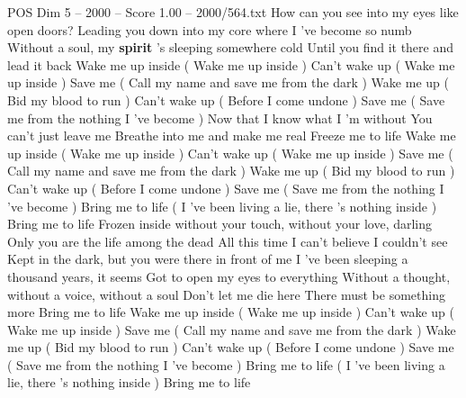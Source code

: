 \begin{textsample}{POS Dim 5 – 2000 – Score 1.00 – 2000/564.txt}  \label{ex:f5_pos_012}
How can you see into my eyes like open doors?
Leading you down into my core where I 've become so numb Without a soul, my \textbf{spirit} 's sleeping somewhere cold Until you find it there and lead it back Wake me up inside ( Wake me up inside ) Can't wake up ( Wake me up inside ) Save me ( Call my name and save me from the dark ) Wake me up ( Bid my blood to run ) Can't wake up ( Before I come undone ) Save me ( Save me from the nothing I 've become ) Now that I know what I 'm without You can't just leave me Breathe into me and make me real Freeze me to life Wake me up inside ( Wake me up inside ) Can't wake up ( Wake me up inside ) Save me ( Call my name and save me from the dark ) Wake me up ( Bid my blood to run ) Can't wake up ( Before I come undone ) Save me ( Save me from the nothing I 've become ) Bring me to life ( I 've been living a lie, there 's nothing inside ) Bring me to life Frozen inside without your touch, without your love, darling Only you are the life among the dead All this time I can't believe I couldn't see Kept in the dark, but you were there in front of me I 've been sleeping a thousand years, it seems Got to open my eyes to everything Without a thought, without a voice, without a soul Don't let me die here There must be something more Bring me to life Wake me up inside ( Wake me up inside ) Can't wake up ( Wake me up inside ) Save me ( Call my name and save me from the dark ) Wake me up ( Bid my blood to run ) Can't wake up ( Before I come undone ) Save me ( Save me from the nothing I 've become ) Bring me to life ( I 've been living a lie, there 's nothing inside ) Bring me to life

\end{textsample}
